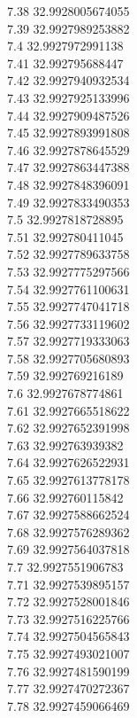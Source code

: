 {7.38	32.9928005674055\\
7.39	32.9927989253882\\
7.4	32.9927972991138\\
7.41	32.992795688447\\
7.42	32.9927940932534\\
7.43	32.9927925133996\\
7.44	32.9927909487526\\
7.45	32.9927893991808\\
7.46	32.9927878645529\\
7.47	32.9927863447388\\
7.48	32.9927848396091\\
7.49	32.9927833490353\\
7.5	32.9927818728895\\
7.51	32.992780411045\\
7.52	32.9927789633758\\
7.53	32.9927775297566\\
7.54	32.9927761100631\\
7.55	32.9927747041718\\
7.56	32.9927733119602\\
7.57	32.9927719333063\\
7.58	32.9927705680893\\
7.59	32.992769216189\\
7.6	32.9927678774861\\
7.61	32.9927665518622\\
7.62	32.9927652391998\\
7.63	32.992763939382\\
7.64	32.9927626522931\\
7.65	32.9927613778178\\
7.66	32.992760115842\\
7.67	32.9927588662524\\
7.68	32.9927576289362\\
7.69	32.9927564037818\\
7.7	32.9927551906783\\
7.71	32.9927539895157\\
7.72	32.9927528001846\\
7.73	32.9927516225766\\
7.74	32.9927504565843\\
7.75	32.9927493021007\\
7.76	32.9927481590199\\
7.77	32.9927470272367\\
7.78	32.9927459066469\\
}
